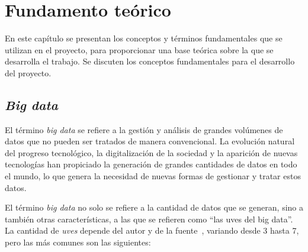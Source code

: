 \chapter{Fundamento teórico}\label{chap:teo}
En este capítulo se presentan los conceptos y términos fundamentales que se
utilizan en el proyecto, para proporcionar una base teórica sobre la que se
desarrolla el trabajo. Se discuten los conceptos fundamentales para el
desarrollo del proyecto.


\section{\textit{Big data}}\label{sec:bigdata}
El término \textit{big data} se refiere a la gestión y análisis de grandes
volúmenes de datos que no pueden ser tratados de manera convencional. La
evolución natural del progreso tecnológico, la digitalización de la sociedad y
la aparición de nuevas tecnologías han propiciado la generación de grandes
cantidades de datos en todo el mundo, lo que genera la necesidad de nuevas
formas de gestionar y tratar estos datos.

El término \textit{big data} no solo se refiere a la cantidad de datos que se
generan, sino a también otras características, a las que se refieren como ``las
uves del big data''. La cantidad de \textit{uves} depende del autor y de la
fuente~\cite{ishwarappa2015vs,sagiroglu2013bigdata}, variando desde 3 hasta 7,
pero las más comunes son las siguientes:

